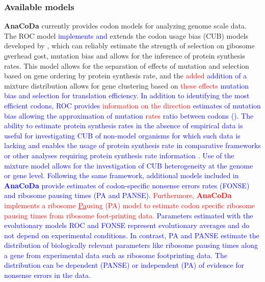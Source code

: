 \documentclass{bioinfo}
\newcommand{\package}{\textbf{AnaCoDa}\xspace} %
\begin{document}
\subsubsection*{Available models}
\package currently provides codon models for analyzing genome scale data.
The ROC model \textcolor{blue}{implements and} extends the codon usage bias (CUB) models developed by \citet{gilchrist2015,wallace2013,shah2011}, which can reliably estimate the strength of selection on \underline{r}ibosome \underline{o}verhead \underline{c}ost, mutation bias and allows for the inference of protein synthesis rates.
This model allows for the separation of effects of mutation and selection based on gene ordering by protein synthesis rate, and the \textcolor{red}{added} \textcolor{blue}{addition of a} mixture distribution allows for gene clustering based on \textcolor{red}{these effects} \textcolor{blue}{mutation bias and selection for translation efficiency}.
\textcolor{blue}{
In addition to identifying the most efficient codons, ROC provides \textcolor{red}{information on the direction} \textcolor{blue}{estimates} of mutation bias allowing the approximation of mutation \textcolor{red}{rates} \textcolor{blue}{ratio} between codons (\citet{gilchrist2015,wallace2013}).
The ability to estimate protein synthesis rates in the absence of empirical data is useful for investigating CUB of non-model organisms for which such data is lacking and enables the usage of protein synthesis rate in comparative frameworks or other analyses requiring protein synthesis rate information \citet{dunn2018}.
Use of the mixture model allows for the investigation of CUB heterogeneity at the genome or gene level.  
Following the same framework, additional models included in \package provide estimates of codon-specific nonsense errors rates (FONSE) and ribosome pausing times (PA and PANSE).
}
\textcolor{red}{
Furthermore, \package implements a ribosome \underline{Pa}using (PA) model to estimate codon specific ribosome pausing times from ribosome foot-printing data.
}
\textcolor{blue}{
Parameters estimated with the evolutionary models ROC and FONSE represent evolutionary averages and do not depend on experimental conditions. 
In contrast, PA and PANSE estimate the distribution of biologically relevant parameters like ribosome pausing times along a gene from experimental data such as ribosome footprinting data. 
The distribution can be dependent (PANSE) or independent (PA) of evidence for nonsense errors in the data.  
}



\end{document}
